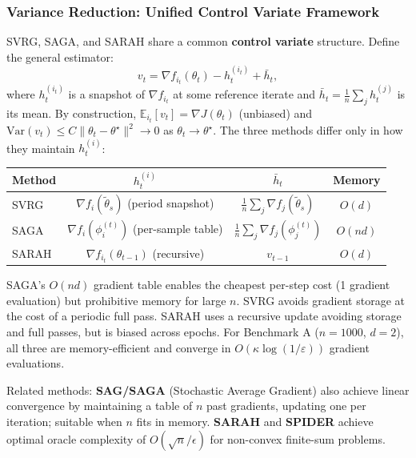 \documentclass[11pt,a4paper]{article}
\theoremstyle{definition}
\begin{document}
\subsubsection{Variance Reduction: Unified Control Variate Framework}

SVRG, SAGA, and SARAH share a common \textbf{control variate} structure. Define the general estimator:
\begin{equation}
v_t = \nabla f_{i_t}(\theta_t) - h_t^{(i_t)} + \bar{h}_t,
\label{eq:cv_estimator}
\end{equation}
where $h_t^{(i_t)}$ is a snapshot of $\nabla f_{i_t}$ at some reference iterate and $\bar{h}_t = \frac{1}{n}\sum_j h_t^{(j)}$ is its mean. By construction, $\mathbb{E}_{i_t}[v_t] = \nabla J(\theta_t)$ (unbiased) and $\text{Var}(v_t) \leq C\|\theta_t - \theta^{\star}\|^2 \to 0$ as $\theta_t \to \theta^{\star}$. The three methods differ only in how they maintain $h_t^{(i)}$:

\begin{center}
\begin{tabular}{lccc}
\toprule
Method & $h_t^{(i)}$ & $\bar{h}_t$ & Memory \\
\midrule
SVRG & $\nabla f_i(\tilde{\theta}_s)$ (period snapshot) & $\frac{1}{n}\sum_j \nabla f_j(\tilde{\theta}_s)$ & $O(d)$ \\
SAGA & $\nabla f_i(\phi_i^{(t)})$ (per-sample table) & $\frac{1}{n}\sum_j \nabla f_j(\phi_j^{(t)})$ & $O(nd)$ \\
SARAH & $\nabla f_{i_t}(\theta_{t-1})$ (recursive) & $v_{t-1}$ & $O(d)$ \\
\bottomrule
\end{tabular}
\end{center}

SAGA's $O(nd)$ gradient table enables the cheapest per-step cost (1 gradient evaluation) but prohibitive memory for large $n$. SVRG avoids gradient storage at the cost of a periodic full pass. SARAH uses a recursive update avoiding storage and full passes, but is biased across epochs. For Benchmark A ($n=1000$, $d=2$), all three are memory-efficient and converge in $O(\kappa \log(1/\varepsilon))$ gradient evaluations.

Related methods: \textbf{SAG/SAGA} (Stochastic Average Gradient) also achieve linear convergence by maintaining a table of $n$ past gradients, updating one per iteration; suitable when $n$ fits in memory. \textbf{SARAH} and \textbf{SPIDER} achieve optimal oracle complexity of $O(\sqrt{n}/\epsilon)$ for non-convex finite-sum problems.
\end{document}
